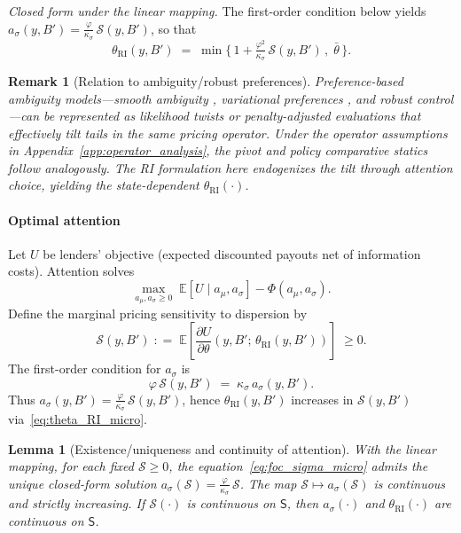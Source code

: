 \documentclass[12pt]{article}
\providecommand{\coloneqq}{\mathrel{\mathop:}=}
\theoremstyle{plain}
\newtheorem{lemma}{Lemma}
\newtheorem{remark}{Remark}
\newcommand{\E}{\mathbb{E}}
\begin{document}
\noindent\textit{Closed form under the linear mapping.} The first-order condition below yields $a_\sigma(y,B')=\tfrac{\varphi}{\kappa_\sigma}\,\mathcal S(y,B')$, so that
\begin{equation}
	\theta_{\mathrm{RI}}(y,B')\;=\; \min\Big\{\,1 + \tfrac{\varphi^2}{\kappa_\sigma}\,\mathcal S(y,B')\,,\;\bar\theta\,\Big\}.
	\label{eq:theta_RI_closed}
\end{equation}

\begin{remark}[Relation to ambiguity/robust preferences]
	Preference-based ambiguity models---smooth ambiguity \citet{KlibanoffMarinacciMukerji2005}, variational preferences \citet{MaccheroniMarinacciRustichini2006}, and robust control \citet{HansenSargent2008}---can be represented as likelihood twists or penalty-adjusted evaluations that effectively tilt tails in the same pricing operator. Under the operator assumptions in Appendix~\ref{app:operator_analysis}, the pivot and policy comparative statics follow analogously. The RI formulation here endogenizes the tilt through attention choice, yielding the state-dependent $\theta_{\mathrm{RI}}(\cdot)$.
\end{remark}

\paragraph{Optimal attention}
Let $U$ be lenders' objective (expected discounted payouts net of information
costs). Attention solves
\begin{equation}
	\max_{a_\mu,a_\sigma\ge0}\; \E[U\mid a_\mu,a_\sigma] - \Phi(a_\mu,a_\sigma).
	\label{eq:att_opt_micro}
\end{equation}
Define the marginal pricing sensitivity to dispersion by
\begin{equation}
	\mathcal S(y,B') \;\coloneqq\; \E\!\left[\frac{\partial U}{\partial \theta}(y,B';\,\theta_{\mathrm{RI}}(y,B'))\right] \;\ge 0.
	\label{eq:sensitivity_def}
\end{equation}
The first-order condition for $a_\sigma$ is
\begin{equation}
	\varphi\, \mathcal S(y,B') \;=\; \kappa_\sigma\, a_\sigma(y,B').
	\label{eq:foc_sigma_micro}
\end{equation}
Thus $a_\sigma(y,B')=\tfrac{\varphi}{\kappa_\sigma}\,\mathcal S(y,B')$, hence
$\theta_{\mathrm{RI}}(y,B')$ increases in $\mathcal S(y,B')$ via~\eqref{eq:theta_RI_micro}.

\begin{lemma}[Existence/uniqueness and continuity of attention]
	\label{lem:attention_solution}
	With the linear mapping, for each fixed $\mathcal S\ge0$, the equation~\eqref{eq:foc_sigma_micro}
	admits the unique closed-form solution $a_\sigma(\mathcal S)=\tfrac{\varphi}{\kappa_\sigma}\,\mathcal S$.
	The map $\mathcal S\mapsto a_\sigma(\mathcal S)$ is continuous and strictly increasing.
	If $\mathcal S(\cdot)$ is continuous on $\mathsf S$, then $a_\sigma(\cdot)$ and
	$\theta_{\mathrm{RI}}(\cdot)$ are continuous on $\mathsf S$.
\end{lemma}
\end{document}

